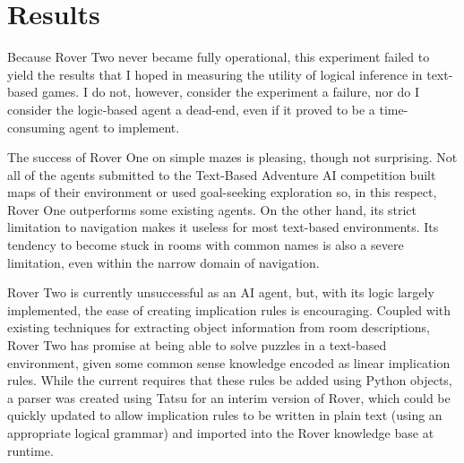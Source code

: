 \section{Results}

Because Rover Two never became fully operational, this experiment failed
to yield the results that I hoped in measuring the utility of logical
inference in text-based games. I do not, however, consider the
experiment a failure, nor do I consider the logic-based agent a
dead-end, even if it proved to be a time-consuming agent to implement.

The success of Rover One on simple mazes is pleasing, though not
surprising. Not all of the agents submitted to the Text-Based Adventure
AI competition built maps of their environment or used goal-seeking
exploration so, in this respect, Rover One outperforms some existing
agents\cite{atkinson_text-based_2019}. On the other hand, its strict
limitation to navigation makes it useless for most text-based
environments. Its tendency to become stuck in rooms with common names
is also a severe limitation, even within the narrow domain of
navigation.

Rover Two is currently unsuccessful as an AI agent, but, with its logic
largely implemented, the ease of creating implication rules is
encouraging. Coupled with existing techniques for extracting object
information from room descriptions, Rover Two has promise at being able
to solve puzzles in a text-based environment, given some common sense
knowledge encoded as linear implication rules. While the current
requires that these rules be added using Python objects, a parser was
created using Tatsu for an interim version of Rover, which could be
quickly updated to allow implication rules to be written in plain text
(using an appropriate logical grammar) and imported into the Rover
knowledge base at runtime.

